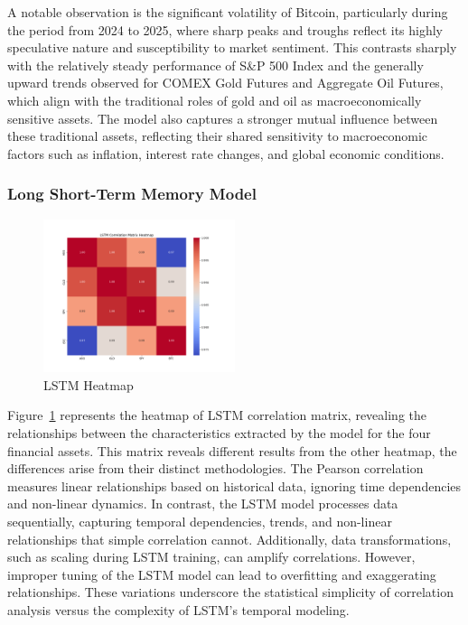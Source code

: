 \documentclass{article}
\begin{document}
A notable observation is the significant volatility of Bitcoin, particularly during the period from 2024 to 2025, where sharp peaks and troughs reflect its highly speculative nature and susceptibility to market sentiment. This contrasts sharply with the relatively steady performance of S\&P 500 Index and the generally upward trends observed for COMEX Gold Futures and Aggregate Oil Futures, which align with the traditional roles of gold and oil as macroeconomically sensitive assets. The model also captures a stronger mutual influence between these traditional assets, reflecting their shared sensitivity to macroeconomic factors such as inflation, interest rate changes, and global economic conditions. 

 





\subsubsection{Long Short-Term Memory Model}





\begin{figure}[h!]
    \centering
    \includegraphics[width=0.5\textwidth]{src/models/results/lstm_correlation_heatmap_with_labels.png}
    \caption{LSTM Heatmap}
    \label{lstmh}
    
\end{figure}


Figure~\ref{lstmh} represents the heatmap of LSTM correlation matrix, revealing the relationships between the characteristics extracted by the model for the four financial assets. This matrix reveals different results from the other heatmap, the differences arise from their distinct methodologies. The Pearson correlation measures linear relationships based on historical data, ignoring time dependencies and non-linear dynamics. In contrast, the LSTM model processes data sequentially, capturing temporal dependencies, trends, and non-linear relationships that simple correlation cannot. Additionally, data transformations, such as scaling during LSTM training, can amplify correlations. However, improper tuning of the LSTM model can lead to overfitting and exaggerating relationships. These variations underscore the statistical simplicity of correlation analysis versus the complexity of LSTM’s temporal modeling. 
\end{document}
